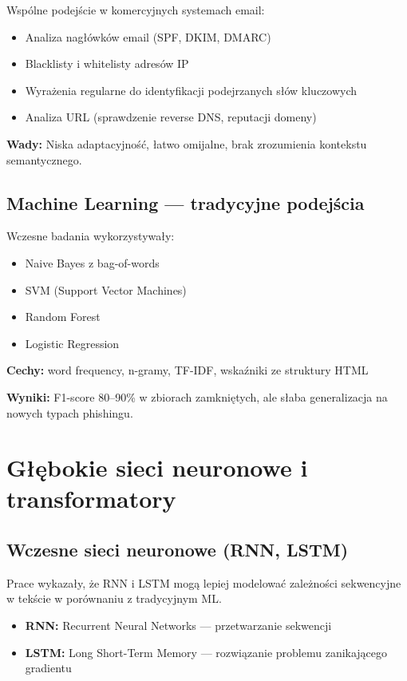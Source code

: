 \documentclass[11pt]{extreport}
\begin{document}
Wspólne podejście w komercyjnych systemach email:
\begin{itemize}
    \item Analiza nagłówków email (SPF, DKIM, DMARC)
    \item Blacklisty i whitelisty adresów IP
    \item Wyrażenia regularne do identyfikacji podejrzanych słów kluczowych
    \item Analiza URL (sprawdzenie reverse DNS, reputacji domeny)
\end{itemize}

\textbf{Wady:} Niska adaptacyjność, łatwo omijalne, brak zrozumienia kontekstu semantycznego.

\subsection{Machine Learning --- tradycyjne podejścia}

Wczesne badania \cite{bergholz2010filtering,fette2007learning} wykorzystywały:
\begin{itemize}
    \item Naive Bayes z bag-of-words
    \item SVM (Support Vector Machines)
    \item Random Forest
    \item Logistic Regression
\end{itemize}

\textbf{Cechy:} word frequency, n-gramy, TF-IDF, wskaźniki ze struktury HTML

\textbf{Wyniki:} F1-score 80--90\% w zbiorach zamkniętych, ale słaba generalizacja na nowych typach phishingu.

\section{Głębokie sieci neuronowe i transformatory}
\label{sec:deep-learning}

\subsection{Wczesne sieci neuronowe (RNN, LSTM)}

Prace \cite{hochreiter1997lstm,chollet2017deep} wykazały, że RNN i LSTM mogą lepiej modelować zależności sekwencyjne w tekście w porównaniu z tradycyjnym ML.

\begin{itemize}
    \item \textbf{RNN:} Recurrent Neural Networks --- przetwarzanie sekwencji
    \item \textbf{LSTM:} Long Short-Term Memory --- rozwiązanie problemu zanikającego gradientu
\end{itemize}
\end{document}
